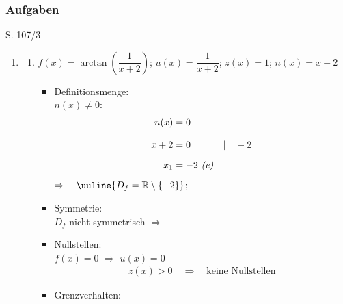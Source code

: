 
\subsubsection{Aufgaben}

\begin{Exercise}{S. 107/3}{}
\begin{enumerate}
    \item [3.]\begin{enumerate}[label=\alph*),leftmargin=*]
        \item[g)] {
            $f(x) = \arctan\left(\dfrac{1}{x+2}\right)$; \qquad $u(x) = \dfrac{1}{x+2}$; \qquad $z(x) = 1$; \qquad $n(x) = x+2$ \\[-2.0ex]
            \begin{itemize}[leftmargin=*]
                \item Definitionsmenge: \\[1.0ex]{
                    $n(x) \neq 0:$\\[-4.0ex]
                    \begin{align*}
                        n(x) &= 0 &&\\[2.0ex]
                        x + 2 &= 0 &&| \quad -2\\[1.5ex]
                        x_{1} &= -2 \ \text{\textit{(e)}}&&
                    \end{align*}
                    $\Rightarrow \quad \uuline{D_{f} = \mathbb{R} \setminus \left\{ -2 \right\}}$;
                    }
                \item Symmetrie: \\[1.0ex]{
                    $D_{f}$ nicht symmetrisch \quad $\Rightarrow$ \quad {}\\[-2.0ex]
                    }
                \item Nullstellen: \\[1.0ex]{
                    $f(x) = 0$ \qquad $\Rightarrow$ \qquad $u(x) = 0$\\[-2.0ex]
                    \begin{align*}
                        z(x) > 0 \quad \Rightarrow \quad \text{keine Nullstellen}
                    \end{align*}
                    }
                \item Grenzverhalten: \\[-3.0ex]{
                    \begin{align*}

\end{align*}}
\end{itemize}}
\end{enumerate}
\end{enumerate}
\end{Exercise}
